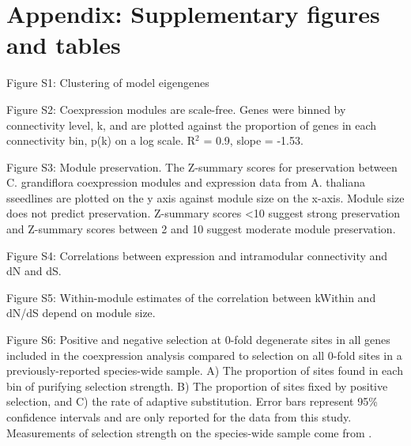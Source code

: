 \section{Appendix: Supplementary figures and tables}

Figure S1: Clustering of model eigengenes




Figure S2: Coexpression modules are scale-free. Genes were binned by connectivity level, k, and are plotted against the proportion of genes in each connectivity bin, p(k) on a log scale. R$^{2}$ = 0.9, slope = -1.53. 


Figure S3: Module preservation. The Z-summary scores for preservation between C. grandiflora coexpression modules and expression data from A. thaliana sseedlines are plotted on the y axis against module size on the x-axis. Module size does not predict preservation. Z-summary scores \textless 10 suggest strong preservation and Z-summary scores between 2 and 10 suggest moderate module preservation.


Figure S4: Correlations between expression and intramodular connectivity and dN and dS.



Figure S5: Within-module estimates of the correlation between kWithin and dN/dS depend on module size. 


Figure S6: Positive and negative selection at 0-fold degenerate sites in all genes included in the coexpression analysis compared to selection on all 0-fold sites in a previously-reported species-wide sample.
A) The proportion of sites found in each bin of purifying selection strength. B) The proportion of sites fixed by positive selection, and C) the rate of adaptive substitution. Error bars represent 95\% confidence intervals and are only reported for the data from this study. Measurements of selection strength on the species-wide sample come from \citep{Williamson2014-tf}.
